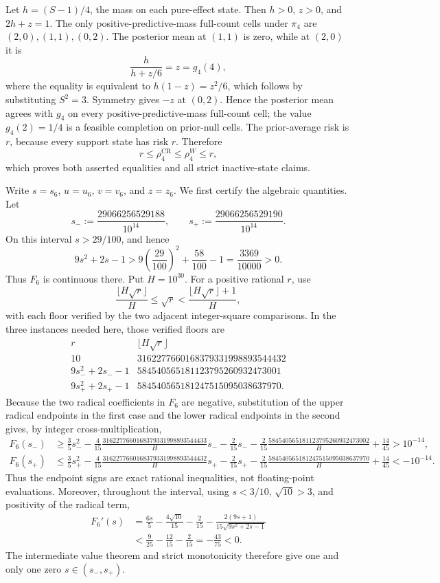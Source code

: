 Let \(h=(S-1)/4\), the mass on each pure-effect state.  Then \(h>0\), \(z>0\), and \(2h+z=1\).  The only positive-predictive-mass full-count cells under \(\pi_4\) are \((2,0),(1,1),(0,2)\).  The posterior mean at \((1,1)\) is zero, while at \((2,0)\) it is
\[
 \frac{h}{h+z/6}=z=g_4(4),
\]
where the equality is equivalent to \(h(1-z)=z^2/6\), which follows by substituting \(S^2=3\).  Symmetry gives \(-z\) at \((0,2)\).  Hence the posterior mean agrees with \(g_4\) on every positive-predictive-mass full-count cell; the value \(g_4(2)=1/4\) is a feasible completion on prior-null cells.  The prior-average risk is \(r\), because every support state has risk \(r\).  Therefore
\[
 r\leq\rho_4^{\mathrm{CR}}\leq\rho_4^W\leq r,
\]
which proves both asserted equalities and all strict inactive-state claims.

Write \(s=s_6\), \(u=u_6\), \(v=v_6\), and \(z=z_6\).  We first certify the algebraic quantities.  Let
\[
 s_-:=\frac{29066256529188}{10^{14}},\qquad
 s_+:=\frac{29066256529190}{10^{14}}.
\]
On this interval \(s>29/100\), and hence
\[
 9s^2+2s-1>9\left(\frac{29}{100}\right)^2+\frac{58}{100}-1
 =\frac{3369}{10000}>0.
\]
Thus \(F_6\) is continuous there.  Put \(H=10^{30}\).  For a positive rational \(r\), use
\[
 \frac{\lfloor H\sqrt r\rfloor}{H}
 \leq\sqrt r<
 \frac{\lfloor H\sqrt r\rfloor+1}{H},
\]
with each floor verified by the two adjacent integer-square comparisons.  In the three instances needed here, those verified floors are
\[
\begin{array}{c|r}
r&\lfloor H\sqrt r\rfloor\\ \hline
10&3162277660168379331998893544432\\
9s_-^2+2s_--1&584540565181123795260932473001\\
9s_+^2+2s_+-1&584540565181247515095038637970.
\end{array}
\]
Because the two radical coefficients in \(F_6\) are negative, substitution of the upper radical endpoints in the first case and the lower radical endpoints in the second gives, by integer cross-multiplication,
\[
\begin{aligned}
F_6(s_-)&\geq \frac35s_-^2-\frac4{15}\frac{3162277660168379331998893544433}{H}s_-
-\frac2{15}s_--\frac2{15}\frac{584540565181123795260932473002}{H}+\frac{14}{45}
>10^{-14},\\
F_6(s_+)&\leq \frac35s_+^2-\frac4{15}\frac{3162277660168379331998893544432}{H}s_+
-\frac2{15}s_+-\frac2{15}\frac{584540565181247515095038637970}{H}+\frac{14}{45}
<-10^{-14}.
\end{aligned}
\]
Thus the endpoint signs are exact rational inequalities, not floating-point evaluations.  Moreover, throughout the interval, using \(s<3/10\), \(\sqrt{10}>3\), and positivity of the radical term,
\[
 \begin{aligned}
 F_6'(s)
 &=\frac{6s}{5}-\frac{4\sqrt{10}}{15}-\frac2{15}
   -\frac{2(9s+1)}{15\sqrt{9s^2+2s-1}}\\
 &<\frac9{25}-\frac{12}{15}-\frac2{15}
 =-\frac{43}{75}<0.
 \end{aligned}
\]
The intermediate value theorem and strict monotonicity therefore give one and only one zero \(s\in(s_-,s_+)\).

